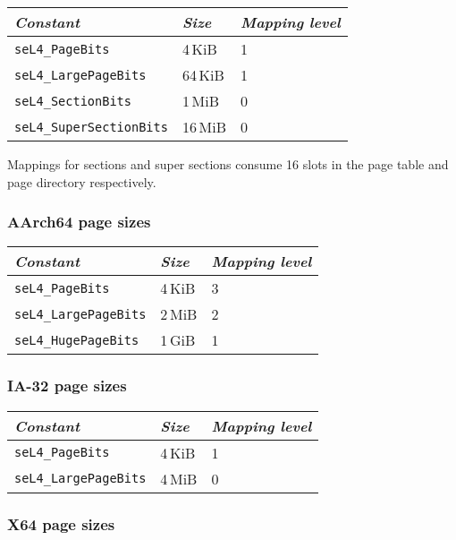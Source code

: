 \begin{tabularx}{\textwidth}{Xll} \toprule
    \emph{Constant}             & \emph{Size} & \emph{Mapping level} \\ \midrule
    \texttt{seL4\_PageBits}      & 4\,KiB      & 1                   \\
    \texttt{seL4\_LargePageBits} & 64\,KiB     & 1                   \\
    \texttt{seL4\_SectionBits}   & 1\,MiB      & 0                   \\
    \texttt{seL4\_SuperSectionBits} & 16\,MiB  & 0                   \\
    \bottomrule
\end{tabularx}

Mappings for sections and super sections consume 16 slots in the page table and page directory
respectively.

\subsubsection{AArch64 page sizes}

\begin{tabularx}{\textwidth}{Xll} \toprule
    \emph{Constant}             & \emph{Size} & \emph{Mapping level} \\ \midrule
    \texttt{seL4\_PageBits}      & 4\,KiB      & 3                   \\
    \texttt{seL4\_LargePageBits} & 2\,MiB     & 2                    \\
    \texttt{seL4\_HugePageBits}  & 1\,GiB     & 1                    \\
    \bottomrule
\end{tabularx}

\subsubsection{IA-32 page sizes}

\begin{tabularx}{\textwidth}{Xll} \toprule
    \emph{Constant}             & \emph{Size} & \emph{Mapping level} \\ \midrule
    \texttt{seL4\_PageBits}      & 4\,KiB      & 1                   \\
    \texttt{seL4\_LargePageBits} & 4\,MiB      & 0                   \\
    \bottomrule
\end{tabularx}

\subsubsection{X64 page sizes}

